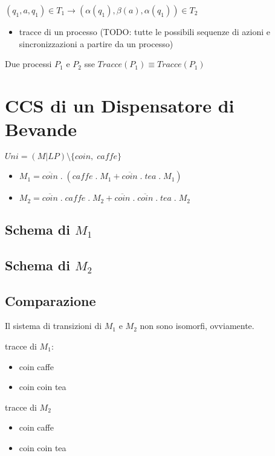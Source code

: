 $(q_1,a,q_1) \in T_1 \rightarrow (\alpha(q_1),\beta(a),\alpha(q_1)) \in T_2$

\begin{itemize}
  \item tracce di un processo (TODO: tutte le possibili sequenze di azioni e sincronizzazioni a partire da un processo)
\end{itemize}

Due processi $P_1$ e $P_2$ sse $Tracce(P_1) \equiv Tracce(P_1)$

\section{CCS di un Dispensatore di Bevande}

$Uni = (M | LP) \setminus \{coin, \; caffe\}$

\begin{itemize}
  \item $M_1 = \overline {coin} \; . \; (caffe \; . \; M_1 + \overline {coin} \; . \; tea \; . \; M_1)$
  \item $M_2 = \overline {coin} \; . \; caffe \; . \; M_2 + \overline {coin} \; . \; \overline {coin} \; . \; tea \; . \; M_2$
\end{itemize}

\subsection{Schema di $M_1$}


\subsection{Schema di $M_2$}


\subsection{Comparazione}

Il sistema di transizioni di $M_1$ e $M_2$ non sono isomorfi, ovviamente.

tracce di $M_1$:
\begin{itemize}
  \item coin caffe
  \item coin coin tea
\end{itemize}

tracce di $M_2$
\begin{itemize}
  \item coin caffe
  \item coin coin tea
\end{itemize}

